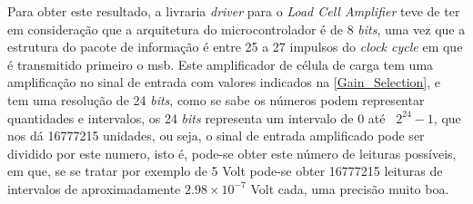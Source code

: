 Para obter este resultado, a livraria \textit{driver} para o \textit{Load Cell Amplifier} teve de ter em consideração que a arquitetura do microcontrolador é de 8 \textit{bits}, uma vez que a estrutura do pacote de informação é entre 25 a 27 impulsos do \textit{clock cycle} em que é transmitido primeiro o \ac{msb}.
\emptyline
Este amplificador de célula de carga tem uma amplificação no sinal de entrada com valores indicados na \autoref{Gain_Selection}, e tem uma resolução de 24 \textit{bits}, como se sabe os números podem representar quantidades e intervalos, os 24 \textit{bits} representa um intervalo de 0 até \, $2^{24}-1$, que nos dá 16777215 unidades, ou seja, o sinal de entrada amplificado pode ser dividido por este numero, isto é, pode-se obter este número de leituras possíveis, em que, se se tratar por exemplo de 5 Volt pode-se obter 16777215 leituras de intervalos de aproximadamente $2.98 \times 10^{-7}$ Volt cada, uma precisão muito boa.
\newpage
